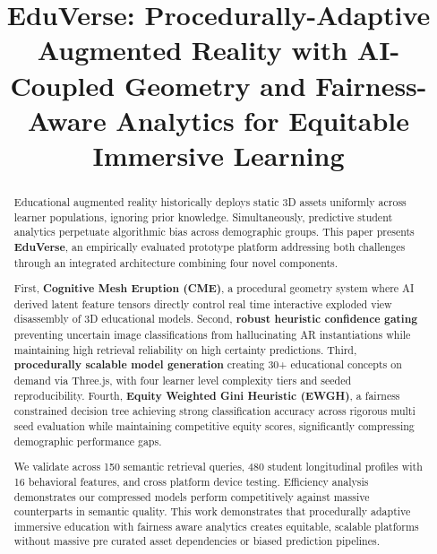 \documentclass[conference]{IEEEtran}
\begin{document}
\title{EduVerse: Procedurally-Adaptive Augmented Reality with AI-Coupled Geometry and Fairness-Aware Analytics for Equitable Immersive Learning}

\author{
\and
{}
}

\maketitle

\begin{abstract}
Educational augmented reality historically deploys static 3D assets uniformly across learner populations, ignoring prior knowledge. Simultaneously, predictive student analytics perpetuate algorithmic bias across demographic groups. This paper presents \textbf{EduVerse}, an empirically evaluated prototype platform addressing both challenges through an integrated architecture combining four novel components.

First, \textbf{Cognitive Mesh Eruption (CME)}, a procedural geometry system where AI derived latent feature tensors directly control real time interactive exploded view disassembly of 3D educational models. Second, \textbf{robust heuristic confidence gating} preventing uncertain image classifications from hallucinating AR instantiations while maintaining high retrieval reliability on high certainty predictions. Third, \textbf{procedurally scalable model generation} creating 30+ educational concepts on demand via Three.js, with four learner level complexity tiers and seeded reproducibility. Fourth, \textbf{Equity Weighted Gini Heuristic (EWGH)}, a fairness constrained decision tree achieving strong classification accuracy across rigorous multi seed evaluation while maintaining competitive equity scores, significantly compressing demographic performance gaps.

We validate across 150 semantic retrieval queries, 480 student longitudinal profiles with 16 behavioral features, and cross platform device testing. Efficiency analysis demonstrates our compressed models perform competitively against massive counterparts in semantic quality. This work demonstrates that procedurally adaptive immersive education with fairness aware analytics creates equitable, scalable platforms without massive pre curated asset dependencies or biased prediction pipelines.
\end{abstract}
\end{document}
